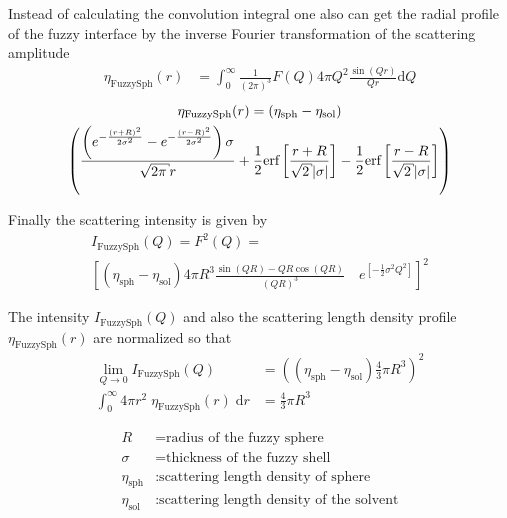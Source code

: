 Instead of calculating the convolution integral one also can get
the radial profile of the fuzzy interface by the inverse Fourier
transformation of the scattering amplitude
\begin{align}
\eta_\text{FuzzySph}(r) &= \int_0^{\infty}
\frac{1}{\left(2\pi\right)^3} F(Q) 4\pi Q^2 \frac{\sin\left(Qr\right)}{Qr} \mathrm{d}Q
\end{align}
\begin{multline}
\eta_\text{FuzzySph}(r) = \left(\eta_\text{sph}-\eta_\text{sol}\right) \\
\left( \frac{
    \left(
          e^{-\frac{\left(r + R\right)^2}{2 \sigma^2}}
        - e^{-\frac{\left(r - R\right)^2}{2 \sigma^2}}
    \right) \sigma}{\sqrt{2 \pi} r}
 + \frac{1}{2} \text{erf}\left[\frac{r + R}{\sqrt{2} \abs{\sigma}}\right]
 - \frac{1}{2} \text{erf}\left[\frac{r - R}{\sqrt{2} \abs{\sigma}}\right]
\right)
\end{multline}

Finally the scattering intensity is given by
\begin{multline}
I_\text{FuzzySph}(Q) = F^2(Q) = \\
\left[ \left(\eta_\text{sph}-\eta_\text{sol}\right) 4\pi R^3
   \frac{\sin\left(QR\right)-QR\cos\left(QR\right)}{\left(QR\right)^3} \quad e^{\left[-\frac{1}{2}\sigma^2Q^2\right]}
\right]^2
\end{multline}

The intensity $I_\text{FuzzySph}(Q)$ and also the scattering
length density profile $\eta_\text{FuzzySph}(r)$ are normalized so that
\begin{align*}
 \lim_{Q \to 0} I_\text{FuzzySph}(Q) &= \left( \left(\eta_\text{sph}-\eta_\text{sol}\right) \frac{4}{3}\pi R^3\right)^2 \\
 \int_0^{\infty} 4\pi r^2 \; \eta_\text{FuzzySph}(r) \; \mathrm{d}r &=\frac{4}{3}\pi R^3
\end{align*}

\begin{align}
R &=\text{radius of the fuzzy sphere} \nonumber\\
\sigma &=\text{thickness of the fuzzy shell} \nonumber\\
\eta_\text{sph}   & : \text{scattering length density of sphere} \nonumber \\
\eta_\text{sol}   & : \text{scattering length density of the solvent} \nonumber \\
\end{align}


